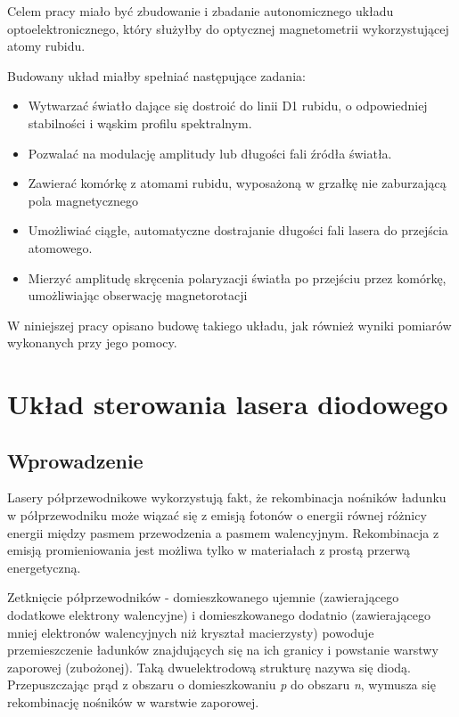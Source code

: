 \documentclass[a4paper,10pt]{article}
\begin{document}
Celem pracy miało być zbudowanie i zbadanie autonomicznego układu optoelektronicznego, który służyłby do optycznej magnetometrii wykorzystującej atomy rubidu.

Budowany układ miałby spełniać następujące zadania:
\begin{itemize}
 \item Wytwarzać światło dające się dostroić do linii D1 rubidu, o odpowiedniej stabilności i wąskim profilu spektralnym.
 \item Pozwalać na modulację amplitudy lub długości fali źródła światła.
 \item Zawierać komórkę z atomami rubidu, wyposażoną w grzałkę nie zaburzającą pola magnetycznego
 \item Umożliwiać ciągłe, automatyczne dostrajanie długości fali lasera do przejścia atomowego. 
 \item Mierzyć amplitudę skręcenia polaryzacji światła po przejściu przez komórkę, umożliwiając obserwację magnetorotacji
\end{itemize}

W niniejszej pracy opisano budowę takiego układu, jak również wyniki pomiarów wykonanych przy jego pomocy.


\section{Układ sterowania lasera diodowego}



\subsection{Wprowadzenie}  %

Lasery półprzewodnikowe wykorzystują fakt, że rekombinacja nośników ładunku w półprzewodniku może wiązać się z emisją fotonów o energii równej różnicy energii między pasmem przewodzenia a pasmem walencyjnym. Rekombinacja z emisją promieniowania jest możliwa tylko w materiałach z prostą przerwą energetyczną.


Zetknięcie półprzewodników - domieszkowanego ujemnie (zawierającego dodatkowe elektrony walencyjne) i domieszkowanego dodatnio (zawierającego mniej elektronów walencyjnych niż kryształ macierzysty) powoduje przemieszczenie ładunków znajdujących się na ich granicy i powstanie warstwy zaporowej (zubożonej). Taką dwuelektrodową strukturę nazywa się diodą. Przepuszczając prąd z obszaru o domieszkowaniu \textit{p} do obszaru \textit{n}, wymusza się rekombinację nośników w warstwie zaporowej.  
\end{document}
